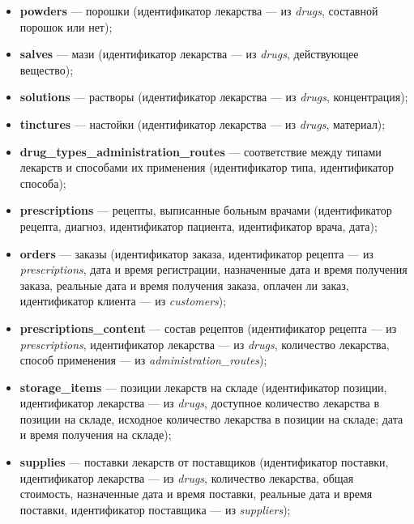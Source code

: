\documentclass[a4paper]{article}
\newcommand{\dbtable}[1]{\textbf{#1}}
\newcommand{\dbtableref}[1]{\textit{#1}}
\begin{document}
\begin{itemize}
				\item \dbtable{powders} --- порошки (идентификатор лекарства --- из \dbtableref{drugs}, составной порошок или нет);
					
				\item \dbtable{salves} --- мази (идентификатор лекарства --- из \dbtableref{drugs}, действующее вещество);
				
				\item \dbtable{solutions} --- растворы (идентификатор лекарства --- из \dbtableref{drugs}, концентрация);
				
				\item \dbtable{tinctures} --- настойки (идентификатор лекарства --- из \dbtableref{drugs}, материал);
				
				\item \dbtable{drug\_types\_administration\_routes} --- соответствие между типами лекарств и способами их применения (идентификатор типа, идентификатор способа);
						
				\item \dbtable{prescriptions} --- рецепты, выписанные больным врачами (идентификатор рецепта, диагноз, идентификатор пациента, идентификатор врача, дата);
				
				\item \dbtable{orders} --- заказы (идентификатор заказа, идентификатор рецепта --- из \dbtableref{prescriptions}, дата и время регистрации, назначенные дата и время получения заказа, реальные дата и время получения заказа, оплачен ли заказ, идентификатор клиента --- из \dbtableref{customers});
				
				\item \dbtable{prescriptions\_content} --- состав рецептов (идентификатор рецепта --- из \dbtableref{prescriptions}, идентификатор лекарства --- из \dbtableref{drugs}, количество лекарства, способ применения --- из \dbtableref{administration\_routes});
				
				\item \dbtable{storage\_items} --- позиции лекарств на складе (идентификатор позиции, идентификатор лекарства --- из \dbtableref{drugs}, доступное количество лекарства в позиции на складе, исходное количество лекарства в позиции на складе; дата и время получения на складе);
				
				\item \dbtable{supplies} --- поставки лекарств от поставщиков (идентификатор поставки, идентификатор лекарства --- из \dbtableref{drugs}, количество лекарства, общая стоимость, назначенные дата и время поставки, реальные дата и время поставки, идентификатор поставщика --- из \dbtableref{suppliers});
					

\end{itemize}
\end{document}
